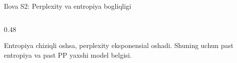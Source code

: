 \documentclass[aspectratio=169,11pt]{beamer}
\newcommand{\uzq}{\textquotesingle{}}
\begin{document}
\begin{frame}{Ilova S2: Perplexity va entropiya bog\uzq{}liqligi}
\begin{columns}[T,totalwidth=\textwidth]
\begin{column}{0.48\textwidth}

\vspace{3pt}

\begin{tcolorbox}[okbox,left=2mm,right=2mm,top=1mm,bottom=1mm]
\scriptsize
Entropiya chiziqli oshsa, perplexity eksponensial oshadi.
Shuning uchun past entropiya va past PP yaxshi model belgisi.
\end{tcolorbox}

\end{column}
\end{columns}

\end{frame}
\end{document}
